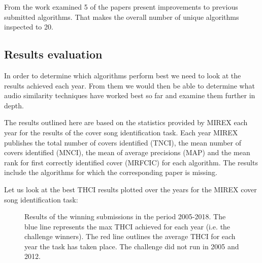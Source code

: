 From the work examined 5 of the papers present improvements to previous submitted algorithms. That makes the overall number of unique algorithms inspected to 20.
\subsection{Results evaluation}
\label{subsec:resultseval}

In order to determine which algorithms perform best we need to look at the
results achieved each year. From them we would then be able to determine what
audio similarity techniques have worked best so far and examine them further in
depth. 

The results outlined here are based on the statistics provided by MIREX each
year for the results of the cover song identification task. Each year MIREX
publishes the total number of covers identified (TNCI), the mean number of
covers identified (MNCI), the mean of average precisions (MAP) and the mean rank
for first correctly identified cover (MRFCIC) for each algorithm. The results
include the algorithms for which the corresponding paper is missing. 

Let us look at the best THCI results plotted over the years for the MIREX cover
song identification task:

\begin{figure}[H]
    \centering
    \caption[THCI of winning submissions in MIREX 2005-2018]{Results of the winning submissions in the period 2005-2018. The blue line represents the max THCI achieved for each year (i.e. the challenge winners). The red line outlines the average THCI for each year the task has taken place. The challenge did not run in 2005 and 2012.}
    \label{fig:mirex_results}
\end{figure}

